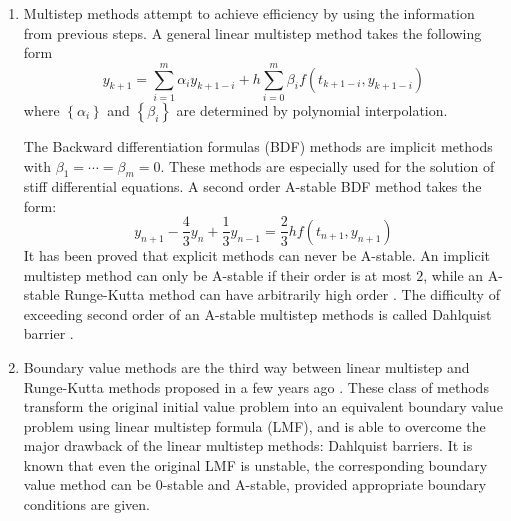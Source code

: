\begin{enumerate}
\item Multistep methods attempt to achieve efficiency by using the information from previous steps. A general linear multistep method takes the following form
\begin{equation}
y_{k+1}=\sum_{i=1}^{m}\alpha_{i}y_{k+1-i}+h\sum_{i=0}^{m}\beta_{i}f\left(t_{k+1-i},y_{k+1-i}\right)
\end{equation}
where $\left\{ \alpha_{i}\right\} $ and $\left\{ \beta_{i}\right\} $ are determined by polynomial interpolation.

The Backward differentiation formulas (BDF) methods are implicit methods with $\beta_1 = \cdots = \beta_m = 0$. These methods are especially used for the solution of stiff differential equations. A second order A-stable BDF method takes the form:
\begin{equation}
y_{n+1} - \frac{4}{3}y_{n} + \frac{1}{3}y_{n-1} = \frac{2}{3}hf(t_{n+1},y_{n+1})
\end{equation}
It has been proved that explicit methods can never be A-stable. An implicit multistep method can only be A-stable if their order is at most $2$, while an A-stable Runge-Kutta method can have arbitrarily high order \cite{Hairer1991Solving}. The difficulty of exceeding second order of an A-stable multistep methods is called Dahlquist barrier \cite{Dahlquist1963, Dahlquist1956}.

\item Boundary value methods are the third way between linear multistep and Runge-Kutta methods proposed in a few years ago \cite{Brugnano1998Boundary}. These class of methods transform the original initial value problem into an equivalent boundary value problem using linear multistep formula (LMF), and is able to overcome the major drawback of the linear multistep methods: Dahlquist barriers. It is known that even the original LMF is unstable, the corresponding boundary value method can be $0$-stable and A-stable, provided appropriate boundary conditions are given.
\end{enumerate}


